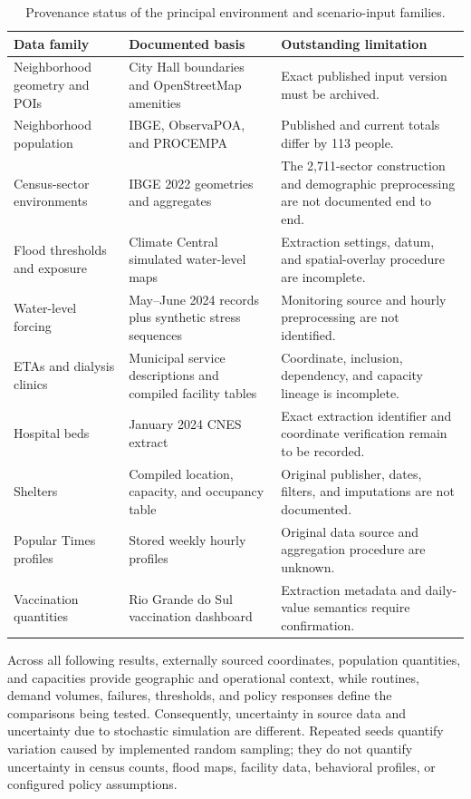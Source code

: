 \begin{table}[ht]
\centering
\footnotesize
\setlength{\tabcolsep}{4pt}
\caption{Provenance status of the principal environment and scenario-input families.}
\label{tbl:simulation_data_provenance}
\begin{tabularx}{\linewidth}{@{}p{3.0cm}p{3.2cm}X@{}}
\toprule
\textbf{Data family} & \textbf{Documented basis} & \textbf{Outstanding limitation} \\
\midrule
Neighborhood geometry and POIs
    & City Hall boundaries and OpenStreetMap amenities
    & Exact published input version must be archived. \\
Neighborhood population
    & IBGE, ObservaPOA, and PROCEMPA
    & Published and current totals differ by 113 people. \\
Census-sector environments
    & IBGE 2022 geometries and aggregates
    & The 2,711-sector construction and demographic preprocessing are not documented end to end. \\
Flood thresholds and exposure
    & Climate Central simulated water-level maps
    & Extraction settings, datum, and spatial-overlay procedure are incomplete. \\
Water-level forcing
    & May--June 2024 records plus synthetic stress sequences
    & Monitoring source and hourly preprocessing are not identified. \\
ETAs and dialysis clinics
    & Municipal service descriptions and compiled facility tables
    & Coordinate, inclusion, dependency, and capacity lineage is incomplete. \\
Hospital beds
    & January 2024 CNES extract
    & Exact extraction identifier and coordinate verification remain to be recorded. \\
Shelters
    & Compiled location, capacity, and occupancy table
    & Original publisher, dates, filters, and imputations are not documented. \\
Popular Times profiles
    & Stored weekly hourly profiles
    & Original data source and aggregation procedure are unknown. \\
Vaccination quantities
    & Rio Grande do Sul vaccination dashboard
    & Extraction metadata and daily-value semantics require confirmation. \\
\bottomrule
\end{tabularx}
\end{table}

Across all following results, externally sourced coordinates, population quantities, and capacities provide geographic and operational context, while routines, demand volumes, failures, thresholds, and policy responses define the comparisons being tested. Consequently, uncertainty in source data and uncertainty due to stochastic simulation are different. Repeated seeds quantify variation caused by implemented random sampling; they do not quantify uncertainty in census counts, flood maps, facility data, behavioral profiles, or configured policy assumptions.
